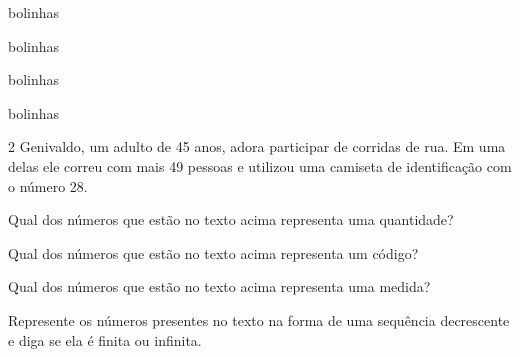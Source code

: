 \begin{escolha}
\item\preencher{} bolinhas




\item\preencher{} bolinhas




\item\preencher{} bolinhas




\item\preencher{} bolinhas



\end{escolha}

\num{2} Genivaldo, um adulto de 45 anos, adora participar de corridas de
rua. Em uma delas ele correu com mais 49 pessoas e utilizou uma camiseta
de identificação com o número 28.

\begin{escolha}
\item
  Qual dos números que estão no texto acima representa uma
  quantidade? \preencher {}
\item
  Qual dos números que estão no texto acima representa um
  código? \preencher {}
\item
  Qual dos números que estão no texto acima representa uma
  medida? \preencher {}
\item
  Represente os números presentes no texto na forma de uma sequência
  decrescente e diga se ela é finita ou infinita.

\end{escolha}

